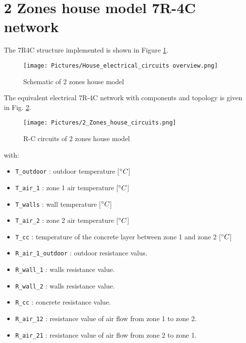 \section{2 Zones house model 7R-4C network}

The 7R4C structure implemented is shown in Figure \ref{fig:schematic7R4C}.
	
\begin{figure}[H]
	\centering
	\texttt{[image: Pictures/House\_electrical\_circuits overview.png]}
	\caption[Short title]{Schematic of 2 zones house model}
	\label{fig:schematic7R4C}
	\end{figure} 
	
The equivalent electrical 7R-4C network with components and topology is given in Fig. \ref{fig:eq7R4C}.

\begin{figure}[H]
	\centering
	\texttt{[image: Pictures/2\_Zones\_house\_circuits.png]}
	\caption[Short title]{R-C circuits of 2 zones house model}
	\label{fig:eq7R4C}
	\end{figure}

with:\\
\begin{itemize}
    \item \texttt{T\_outdoor} : outdoor temperature [$^\circ C$] 
    \item \texttt{T\_air\_1}  : zone 1 air temperature [$^\circ C$]
    \item \texttt{T\_walls}   : wall temperature [$^\circ C$]
    \item \texttt{T\_air\_2}  : zone 2 air temperature [$^\circ C$]
    \item \texttt{T\_cc}      : temperature of the concrete layer between zone 1 and zone 2 [$^\circ C$]
    \item \texttt{R\_air\_1\_outdoor} : outdoor resistance valus.
    \item \texttt{R\_wall\_1} : walls resistance value.
    \item \texttt{R\_wall\_2} : walls resistance value.
    \item \texttt{R\_cc}      : concrete resistance value.
    \item \texttt{R\_air\_12} : resistance value of air flow from zone 1 to zone 2.
    \item \texttt{R\_air\_21} : resistance value of air flow from zone 2 to zone 1.

\end{itemize}

\newpage